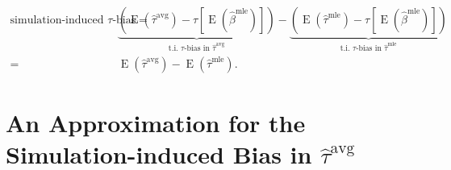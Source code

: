 \documentclass[11pt]{article}
\DeclareMathOperator*{\E}{\text{E}}
\begin{document}
\begin{align*}
\text{simulation-induced } \tau\text{-bias} =& \underbrace{ \left( \E \left( \hat{\tau}^\text{avg}\right) - \tau \left[\E \left( \hat{\beta}^\text{mle} \right) \right] \right) }_{\text{t.i. } \tau\text{-bias in }\hat{\tau}^{\text{avg}}} - \underbrace{ \left( \E \left( \hat{\tau}^\text{mle}\right) -  \tau \left[\E \left( \hat{\beta}^\text{mle} \right) \right] \right) }_{\text{t.i. } \tau\text{-bias in }\hat{\tau}^{\text{mle}}} \\
 =& \E \left( \hat{\tau}^\text{avg}\right) - \E \left( \hat{\tau}^\text{mle}\right) .
\end{align*}





\section*{An Approximation for the Simulation-induced Bias in $\hat{\tau}^\text{avg}$}
\end{document}
